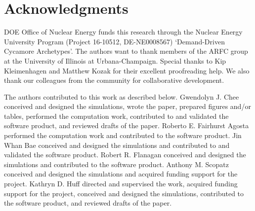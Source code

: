 \section{Acknowledgments}
\gls{DOE} Office of Nuclear Energy funds this research through 
the  Nuclear Energy University Program (Project 16-10512, DE-NE0008567) 
`Demand-Driven Cycamore Archetypes'. The authors want to thank 
members of the \gls{ARFC} group at the University of Illinois at 
Urbana-Champaign. 
Special thanks to Kip Kleimenhagen and Matthew Kozak 
for their excellent proofreading help. 
We also thank our colleagues from the \Cyclus community
for collaborative \Cyclus development.

The authors contributed to this work as described below. 
Gwendolyn J. Chee conceived and designed the simulations, wrote the paper, 
prepared figures and/or tables, performed the computation work, contributed to
and validated the software product, and reviewed drafts of the paper. 
Roberto E. Fairhurst Agosta performed the computation work and contributed to
the software product. 
Jin Whan Bae conceived and designed the simulations and contributed to and validated
the software product. 
Robert R. Flanagan conceived and designed the simulations and contributed to 
the software product. 
Anthony M. Scopatz conceived and designed the simulations and acquired funding 
support for the project. 
Kathryn D. Huff directed and supervised the work, acquired funding 
support for the project, conceived and designed the simulations, contributed to 
the software product, and reviewed drafts of the paper.